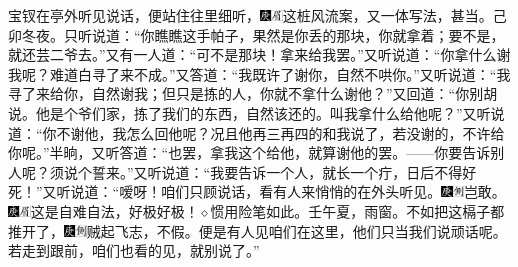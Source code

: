宝钗在亭外听见说话，便站住往里细听，{\includegraphics[width=3mm]{../Images/00004}\includegraphics[width=3mm]{../Images/00010}\footnotesize \kaishu 这桩风流案，又一体写法，甚当。己卯冬夜。}只听说道：“你瞧瞧这手帕子，果然是你丢的那块，你就拿着；要不是，就还芸二爷去。”又有一人道：“可不是那块！拿来给我罢。”又听说道：“你拿什么谢我呢？难道白寻了来不成。”又答道：“我既许了谢你，自然不哄你。”又听说道：“我寻了来给你，自然谢我；但只是拣的人，你就不拿什么谢他？”又回道：“你别胡说。他是个爷们家，拣了我们的东西，自然该还的。叫我拿什么给他呢？”又听说道：“你不谢他，我怎么回他呢？况且他再三再四的和我说了，若没谢的，不许给你呢。”半晌，又听答道：“也罢，拿我这个给他，就算谢他的罢。------你要告诉别人呢？须说个誓来。”又听说道：“我要告诉一个人，就长一个疔，日后不得好死！”又听说道：“嗳呀！咱们只顾说话，看有人来悄悄的在外头听见。{\includegraphics[width=3mm]{../Images/00004}\includegraphics[width=3mm]{../Images/00011}\footnotesize \kaishu 岂敢。　\includegraphics[width=3mm]{../Images/00004}\includegraphics[width=3mm]{../Images/00010}\footnotesize \kaishu 这是自难自法，好极好极！{$\diamond$}惯用险笔如此。壬午夏，雨窗。}不如把这槅子都推开了，{\includegraphics[width=3mm]{../Images/00004}\includegraphics[width=3mm]{../Images/00011}\footnotesize \kaishu 贼起飞志，不假。}便是有人见咱们在这里，他们只当我们说顽话呢。若走到跟前，咱们也看的见，就别说了。”

